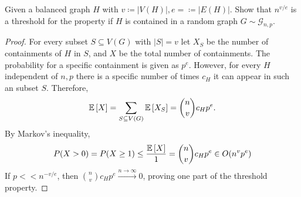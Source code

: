 \begin{aufgabe}
	Given a balanced graph $H$ with $v \coloneqq |V(H)|, e = \coloneqq |E(H)|$.
	Show that $n^{v/e}$ is a threshold for the property if $H$ is contained in a random graph $G \sim \mathcal{G}_{n,p}$.
	\begin{proof}
		For every subset $S \subseteq V(G)$ with $|S| = v$ let $X_S$ be the number of containments of $H$ in $S$, and $X$ be the total number of containments.
		The probability for a specific containment is given as $p^e$.
		However, for every $H$ independent of $n,p$ there is a specific number of times $c_H$ it can appear in such an subset $S$.
		Therefore,
		\begin{align*}
			\mathbb{E}\left[X\right] = \sum_{S \subseteq V(G)}\mathbb{E}\left[X_S\right] = \binom{n}{v} c_H p^e.
		\end{align*}
		By Markov's inequality,
		\begin{align*}
			P(X > 0) = P(X \geq 1) \leq \frac{\mathbb{E}\left[X\right]}{1}=\binom{n}{v} c_H p^e \in O(n^vp^e)
		\end{align*}
		If $p << n^{-v/e}$, then $\binom{n}{v} c_H p^e  \xrightarrow{n \rightarrow \infty} 0$, proving one part of the threshold property.


\end{proof}
\end{aufgabe}
